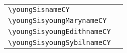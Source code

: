 \sblngboxcfg{1ex}
\fbox{\usebox{\youngSis}}
\hfill
%
\makeatletter
\let\nameuse=\@nameuse
\makeatother
\newcommand{\boxsz}[1]{%
  \texttt{\textbackslash#1} & \nameuse{#1}\\%
}
\newcommand{\tblA}{%
  \begin{tabular}{l|l}%
    \boxsz{youngSisnameCY}%
    \boxsz{youngSisyoungMarynameCY}%
    \boxsz{youngSisyoungEdithnameCY}%
    \boxsz{youngSisyoungSybilnameCY}%
  \end{tabular}%
}
\par
\bigskip
\hfill\tblA
